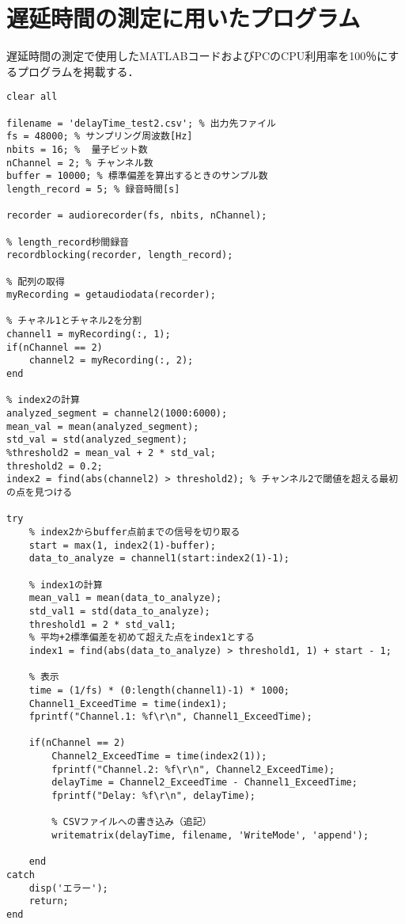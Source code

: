 \chapter{遅延時間の測定に用いたプログラム}
\label{chap:matlab}
遅延時間の測定で使用したMATLABコードおよびPCのCPU利用率を100％にするプログラムを掲載する．
\begin{lstlisting}[caption=DelayCheck.m]
  clear all

filename = 'delayTime_test2.csv'; % 出力先ファイル
fs = 48000; % サンプリング周波数[Hz]
nbits = 16; %  量子ビット数
nChannel = 2; % チャンネル数
buffer = 10000; % 標準偏差を算出するときのサンプル数
length_record = 5; % 録音時間[s]

recorder = audiorecorder(fs, nbits, nChannel);

% length_record秒間録音
recordblocking(recorder, length_record); 

% 配列の取得
myRecording = getaudiodata(recorder);

% チャネル1とチャネル2を分割
channel1 = myRecording(:, 1);
if(nChannel == 2)
    channel2 = myRecording(:, 2);
end

% index2の計算
analyzed_segment = channel2(1000:6000);
mean_val = mean(analyzed_segment);
std_val = std(analyzed_segment);
%threshold2 = mean_val + 2 * std_val;
threshold2 = 0.2;
index2 = find(abs(channel2) > threshold2); % チャンネル2で閾値を超える最初の点を見つける

try
    % index2からbuffer点前までの信号を切り取る
    start = max(1, index2(1)-buffer);  
    data_to_analyze = channel1(start:index2(1)-1);

    % index1の計算
    mean_val1 = mean(data_to_analyze);
    std_val1 = std(data_to_analyze);
    threshold1 = 2 * std_val1;
    % 平均+2標準偏差を初めて超えた点をindex1とする
    index1 = find(abs(data_to_analyze) > threshold1, 1) + start - 1;

    % 表示
    time = (1/fs) * (0:length(channel1)-1) * 1000;
    Channel1_ExceedTime = time(index1);
    fprintf("Channel.1: %f\r\n", Channel1_ExceedTime);

    if(nChannel == 2)
        Channel2_ExceedTime = time(index2(1));
        fprintf("Channel.2: %f\r\n", Channel2_ExceedTime);
        delayTime = Channel2_ExceedTime - Channel1_ExceedTime;
        fprintf("Delay: %f\r\n", delayTime);

        % CSVファイルへの書き込み（追記）
        writematrix(delayTime, filename, 'WriteMode', 'append');

    end
catch
    disp('エラー');
    return;
end


\end{lstlisting}
